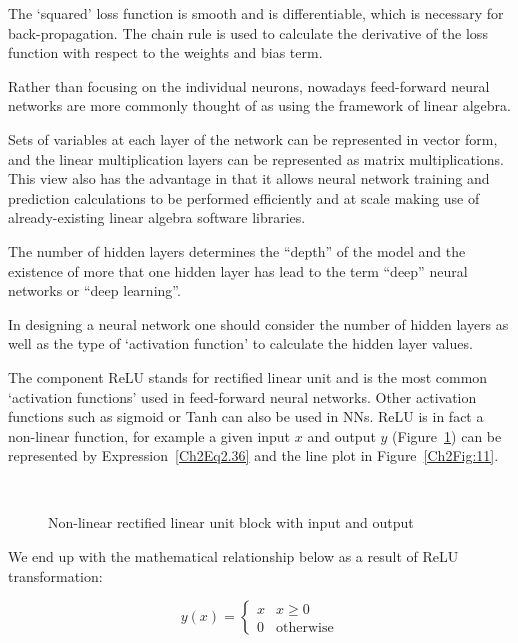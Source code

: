 The `squared' loss function is smooth and is differentiable, which is necessary for back-propagation. The chain rule is used to calculate the derivative of the loss function with respect to the weights and bias term.

Rather than focusing on the individual neurons, nowadays feed-forward neural networks are more commonly thought of as using the framework of linear algebra.

Sets of variables at each layer of the network can be represented in vector form, and the linear multiplication layers can be represented as matrix multiplications. This view also has the advantage in that it allows neural network training and prediction calculations to be performed efficiently and at scale making use of already-existing linear algebra software libraries.

The number of hidden layers determines the ``depth'' of the model and the existence of more that one hidden layer has lead to the term ``deep'' neural networks or ``deep learning''.

In designing a neural network one should consider the number of hidden layers as well as the type of `activation function' to calculate the hidden layer values.

The component ReLU stands for rectified linear unit and is the most common `activation functions' used in feed-forward neural networks. Other activation functions such as sigmoid or Tanh can also be used in NNs. ReLU is in fact a non-linear function, for example a given input $x$ and output $y$ (Figure~\ref{Ch2Fig:10}) can be represented by Expression~\ref{Ch2Eq2.36} and the line plot in Figure~\ref{Ch2Fig:11}.

\begin{figure}[!ht]\centering
    \strut\\
    \caption{Non-linear rectified linear unit block with input and output}\label{Ch2Fig:10}
\end{figure}

We end up with the mathematical relationship below as a result of ReLU transformation:

\begin{equation}\label{Ch2Eq2.36}
    y(x) = \left\{
        \begin{array}{ll}
            x & \text{$x\geq0$} \\
            0 & \text{otherwise}
        \end{array}\right.
\end{equation}

